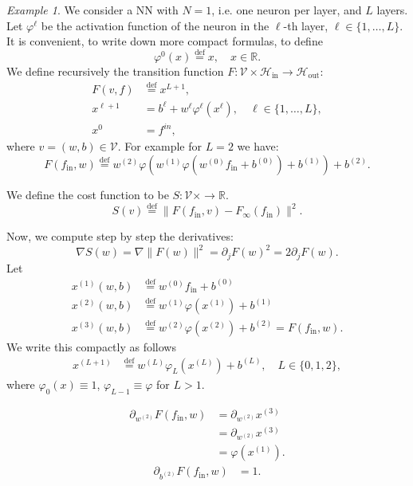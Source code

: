 \documentclass[10pt, a4paper]{article}
\theoremstyle{plain}
\theoremstyle{definition}
\theoremstyle{definition}
\theoremstyle{definition}
\theoremstyle{definition}
\theoremstyle{definition}
\theoremstyle{definition}
\theoremstyle{definition}
\theoremstyle{remark}
\theoremstyle{remark}
\newtheorem{example}[theorem]{Example}
\theoremstyle{rudin-style-generic}
\theoremstyle{rudin-style-generic*}
\theoremstyle{rudin-style-theorem}
\newcommand{\deq}{\stackrel{\mathrm{def}}{=}}
\newcommand{\RR}{\mathbb R}
\begin{document}
\begin{example}
  We consider a NN with $N=1$, i.e. one neuron per layer, and $L$ layers.
  Let $\varphi^\ell$ be the activation function of the neuron in the $\ell$-th layer, $\ell\in\{1,\dots, L\}$.
  It is convenient, to write down more compact formulas, to define
  $$
  \varphi^0(x) \deq x,\quad x\in \RR
  .
  $$
  We define recursively the transition function
  $F:\mathcal V\times \mathcal  H_{\text{in}}\rightarrow \mathcal H_{\text{out}}$:
  \begin{align*}
    F(v,f) &\deq x^{L+1} , \\
    x^{\ell+1} &= b^\ell + w^\ell \varphi^\ell ( x^\ell ),\quad \ell \in \{ 1,\dots , L\} , \\
    x^{0} &= f^{in},
  \end{align*}
  where $v=(w,b)\in\mathcal V$.
  For example for $L=2$ we have:
  $$
  F(f_{\text{in}},w) \deq  w^{(2)} \varphi( w^{(1)} \varphi( w^{(0)} f_{\text{in}} + b^{(0)} ) + b^{(1)} ) + b^{(2)} 
  .
  $$

  We define the cost function to be $S:\mathcal V\times \rightarrow\RR$.
  $$
  S(v) \deq \|F(f_{\text{in}},v) - F_{\infty}(f_{\text{in}} ) \|^2
  .
  $$

  Now, we compute step by step the derivatives:
  $$
  \nabla S(w) = \nabla\|F(w)\|^2 = \partial_j  F(w)^2 = 2\partial_j F(w)
  .
$$
Let 
\begin{align*}
	x^{(1)}(w,b) &\deq w^{(0)} f_{\text{in}} + b^{(0)}\\
	x^{(2)}(w,b) &\deq w^{(1)} \varphi(x^{(1)}) + b^{(1)}\\
	x^{(3)}(w,b) &\deq w^{(2)} \varphi(x^{(2)}) + b^{(2)} = F(f_{\text{in}}, w)
	.
\end{align*}
We write this compactly as follows
\begin{align*}
	x^{(L+1)} &\deq w^{(L)} \varphi_{L}( x^{(L)} ) + b^{(L)},
	\quad L\in\{0,1,2\}
	,
\end{align*}
where $\varphi_0(x) \equiv 1$, $\varphi_{L-1} \equiv \varphi$ for $L>1$. 





\begin{align*}
	\partial_{w^{(2)}} F(f_{\text{in}}, w)
 	&= \partial_{w^{(2)}} x^{(3)} \\
	&=  \partial_{w^{(2)}} x^{(3)} \\
	&=  \varphi( x^{(1)} )
	.
\end{align*}
\begin{align*}
	\partial_{b^{(2)}} F(f_{\text{in}}, w)
	&= 1
	.
\end{align*}


\end{example}
\end{document}
